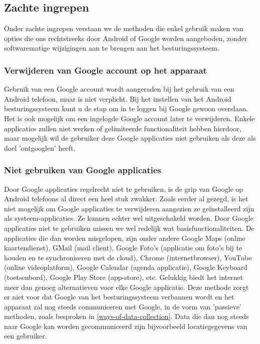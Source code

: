 \subsection{Zachte ingrepen}
\label{softmethods}

Onder zachte ingrepen verstaan we de methoden die enkel gebruik maken van opties die ons rechtstreeks door Android of Google worden aangeboden, zonder softwarematige wijzigingen aan te brengen aan het besturingssysteem.

\subsubsection{Verwijderen van Google account op het apparaat}

Gebruik van een Google account wordt aangeraden bij het gebruik van een Android telefoon, maar is niet verplicht. Bij het instellen van het Android besturingssysteem kunt u de stap om in te loggen bij Google gewoon overslaan. Het is ook mogelijk om een ingelogde Google account later te verwijderen. Enkele applicaties zullen niet werken of gelimiteerde functionaliteit hebben hierdoor, maar mogelijk wil de gebruiker deze Google applicaties niet gebruiken als deze als doel 'ontgooglen' heeft.

\subsubsection{Niet gebruiken van Google applicaties}
Door Google applicaties regelrecht niet te gebruiken, is de grip van Google op Android telefoons al direct een heel stuk zwakker.
Zoals eerder al gezegd, is het niet mogelijk om Google applicaties te verwijderen aangezien ze geïnstalleerd zijn als systeem-applicaties. Ze kunnen echter wel uitgeschakeld worden. Door Google applicaties niet te gebruiken missen we wel redelijk wat basisfunctionaliteiten. De applicaties die dan worden misgelopen, zijn onder andere Google Maps (online kaartendienst), GMail (mail client), Google Foto's (applicatie om foto's bij te houden en te synchroniseren met de cloud), Chrome (internetbrowser), YouTube (online videoplatform), Google Calendar (agenda applicatie), Google Keyboard (toetsenbord), Google Play Store (app-store), etc.  Gelukkig biedt het internet meer dan genoeg alternatieven voor elke Google applicatie. Deze methode zorgt er niet voor dat Google van het besturingssysteem verbannen wordt en het apparaat zal nog steeds communiceren met Google, in de vorm van 'passieve' methoden, zoals besproken in \ref{ways-of-data-collection}. Data die dan nog steeds naar Google kan worden gecommuniceerd zijn bijvoorbeeld locatiegegevens van een gebruiker.

